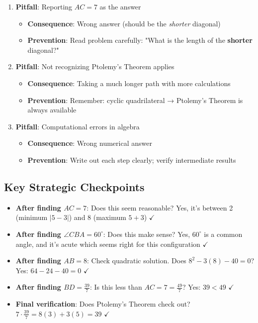 \documentclass[11pt]{article}
\begin{document}
\begin{solutionbox}
\begin{enumerate}
    \item \textbf{Pitfall}: Reporting $AC = 7$ as the answer
    \begin{itemize}
        \item \textbf{Consequence}: Wrong answer (should be the \emph{shorter} diagonal)
        \item \textbf{Prevention}: Read problem carefully: "What is the length of the \textbf{shorter} diagonal?"
    \end{itemize}
    
    \item \textbf{Pitfall}: Not recognizing Ptolemy's Theorem applies
    \begin{itemize}
        \item \textbf{Consequence}: Taking a much longer path with more calculations
        \item \textbf{Prevention}: Remember: cyclic quadrilateral → Ptolemy's Theorem is always available
    \end{itemize}
    
    \item \textbf{Pitfall}: Computational errors in algebra
    \begin{itemize}
        \item \textbf{Consequence}: Wrong numerical answer
        \item \textbf{Prevention}: Write out each step clearly; verify intermediate results
    \end{itemize}
\end{enumerate}

\subsection*{Key Strategic Checkpoints}

\begin{itemize}
    \item \textbf{After finding $AC = 7$}: Does this seem reasonable? Yes, it's between 2 (minimum $|5-3|$) and 8 (maximum $5+3$) $\checkmark$
    
    \item \textbf{After finding $\angle CBA = 60^\circ$}: Does this make sense? Yes, $60^\circ$ is a common angle, and it's acute which seems right for this configuration $\checkmark$
    
    \item \textbf{After finding $AB = 8$}: Check quadratic solution. Does $8^2 - 3(8) - 40 = 0$? Yes: $64 - 24 - 40 = 0$ $\checkmark$
    
    \item \textbf{After finding $BD = \frac{39}{7}$}: Is this less than $AC = 7 = \frac{49}{7}$? Yes: $39 < 49$ $\checkmark$
    
    \item \textbf{Final verification}: Does Ptolemy's Theorem check out? $7 \cdot \frac{39}{7} = 8(3) + 3(5) = 39$ $\checkmark$
\end{itemize}
\end{solutionbox}
\end{document}
